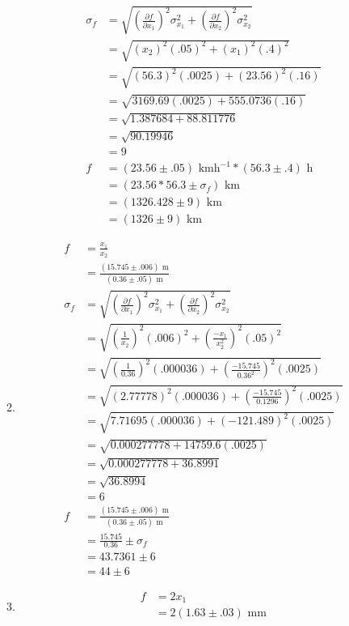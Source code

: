 \documentclass{article}
\begin{document}
\begin{enumerate}
\begin{enumerate}
\begin{align*}
\sigma_{f} &= \sqrt{(\frac{\partial f}{\partial x_{1}})^2\sigma_{x_{1}}^2 + (\frac{\partial f}{\partial x_{2}})^2\sigma_{x_{2}}^2}\\
&= \sqrt{(x_{2})^2(.05)^2 + (x_{1})^2(.4)^2}\\
&= \sqrt{(56.3)^2(.0025) + (23.56)^2(.16)}\\
&= \sqrt{3169.69(.0025) + 555.0736(.16)}\\
&= \sqrt{1.387684 + 88.811776}\\
&= \sqrt{90.19946}\\
&= 9\\
f &= (23.56 \pm .05)\text{ kmh}^{-1} * (56.3 \pm .4)\text{ h}\\
&= (23.56 * 56.3 \pm \sigma_{f})\text{ km}\\
&= (1326.428 \pm 9)\text{ km}\\
&= (1326 \pm 9)\text{ km}
\end{align*}
\item
\begin{align*}
f &= \frac{x_{1}}{x_{2}}\\
&= \frac{(15.745 \pm .006)\text{ m}}{(0.36 \pm .05)\text{ m}}\\
\sigma_{f} &= \sqrt{(\frac{\partial f}{\partial x_{1}})^2\sigma_{x_{1}}^2 + (\frac{\partial f}{\partial x_{2}})^2\sigma_{x_{2}}^2}\\
&= \sqrt{(\frac{1}{x_{2}})^2(.006)^2 + (\frac{-x_{1}}{x_{2}^2})^2(.05)^2}\\
&= \sqrt{(\frac{1}{0.36})^2(.000036) + (\frac{-15.745}{0.36^2})^2(.0025)}\\
&= \sqrt{(2.77778)^2(.000036) + (\frac{-15.745}{0.1296})^2(.0025)}\\
&= \sqrt{7.71695(.000036) + (-121.489)^2(.0025)}\\
&= \sqrt{0.000277778 + 14759.6(.0025)}\\
&= \sqrt{0.000277778 + 36.8991}\\
&= \sqrt{36.8994}\\
&= 6\\
f &= \frac{(15.745 \pm .006)\text{ m}}{(0.36 \pm .05)\text{ m}}\\
&= \frac{15.745}{0.36} \pm \sigma_{f}\\
&= 43.7361 \pm 6\\
&= 44 \pm 6
\end{align*}
\item
\begin{align*}
f &= 2x_{1}\\
&= 2(1.63 \pm .03)\text{ mm}\\

\end{align*}
\end{enumerate}
\end{enumerate}
\end{document}
